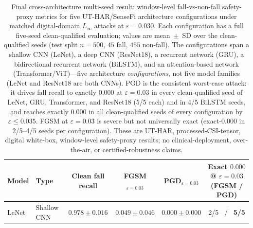 
\begin{table}[t]
  \centering
  \caption[Final cross-architecture multi-seed adversarial safety-proxy collapse]{%
    Final cross-architecture multi-seed result: window-level fall-vs-non-fall
    safety-proxy metrics for five UT-HAR/SenseFi architecture configurations under
    matched digital-domain $L_\infty$ attacks at $\varepsilon=0.030$. Each
    configuration has a full five-seed clean-qualified evaluation; values are
    mean~$\pm$~SD over the clean-qualified seeds (test split $n=500$, $45$ fall,
    $455$ non-fall). The configurations span a shallow CNN (LeNet), a deep CNN
    (ResNet18), a recurrent network (GRU), a bidirectional recurrent network
    (BiLSTM), and an attention-based network (Transformer/ViT)---five architecture
    \emph{configurations}, not five model families (LeNet and ResNet18 are both
    CNNs). PGD is the consistent worst-case attack: it drives fall recall to
    exactly $0.000$ at $\varepsilon=0.03$ in every clean-qualified seed of LeNet,
    GRU, Transformer, and ResNet18 (5/5 each) and in 4/5 BiLSTM seeds, and reaches
    exactly $0.000$ in all clean-qualified seeds of every configuration by
    $\varepsilon\le0.035$. FGSM at $\varepsilon=0.03$ is severe but not universally
    exact (exact-$0.000$ in 2/5--4/5 seeds per configuration). These are UT-HAR,
    processed-CSI-tensor, digital white-box, window-level safety-proxy results; no
    clinical-deployment, over-the-air, or certified-robustness claims.}
  \label{tab:cross-arch-multiseed}
  \begin{tabular}{l l c c c c}
    \toprule
    Model & Type & Clean fall recall & FGSM$_{\varepsilon{=}0.03}$ & PGD$_{\varepsilon{=}0.03}$ & Exact $0.000$ @ $\varepsilon{=}0.03$ (FGSM / PGD) \\
    \midrule
    LeNet       & Shallow CNN             & $0.978 \pm 0.016$ & $0.049 \pm 0.046$ & $\mathbf{0.000 \pm 0.000}$ & 2/5 \ / \ \textbf{5/5} \\

\end{tabular}
\end{table}
